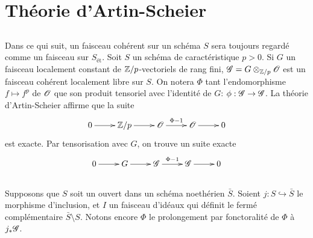 \section{Théorie d'Artin-Scheier}\label{III:3}





\subsection{}\label{III:3-1}

Dans ce qui suit, un faisceau cohérent sur un schéma $S$ sera toujours 
regardé comme un faisceau sur $S_\text{ét}$. Soit $S$ un schéma de 
caractéristique $p>0$. Si $G$ un faisceau localement constant de 
$\mathbb{Z}/p$-vectoriels de rang fini, $\mathscr{G}=G\otimes_{\mathbb{Z}/p}\mathscr{O}$ est un faisceau 
cohérent localement libre sur $S$. On notera $\Phi$ tant l'endomorphisme 
$f\mapsto f^p$ de $\mathscr{O}$ que son produit tensoriel avec l'identité de 
$G$: $\phi:\mathscr{G}\to\mathscr{G}$. La théorie d'Artin-Scheier \cite[IX 3.5]{sga4} 
affirme que la suite 
\[\xymatrix{
  0 \ar[r] 
    & \dZ/p \ar[r] 
    & \cO \ar[r]^-{\Phi-1} 
    & \cO \ar[r] 
    & 0
}\]
est exacte. Par tensorisation avec $G$, on trouve un suite exacte 
\[\xymatrix{
  0 \ar[r] 
    & G \ar[r] 
    & \cG \ar[r]^-{\Phi-1} 
    & \cG \ar[r] 
    & 0
}\]





\subsection{}\label{III:3-2}

Supposons que $S$ soit un ouvert dans un schéma noethérien $\bar S$. 
Soient $j:S\hookrightarrow \bar S$ le morphisme d'inclusion, et $I$ un 
faisceau d'idéaux qui définit le fermé complémentaire 
$\bar S\setminus S$. Notons encore $\Phi$ le prolongement par fonctoralité 
de $\Phi$ à $j_*\mathscr{G}$. 






